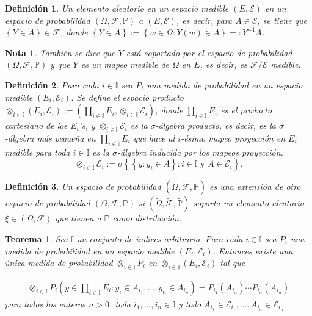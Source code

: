 \documentclass{article}
\newtheorem{Def}{Definición}
\newtheorem{Teo}{Teorema}
\newtheorem{Note}{Nota}
\newcommand{\prob}{\mathbb{P}}
\begin{document}
\begin{Def}
Un elemento aleatorio en un espacio medible $\left(E,\mathcal{E}\right)$ en un espacio de probabilidad $\left(\Omega,\mathcal{F},\prob\right)$ a $\left(E,\mathcal{E}\right)$, es decir,
para $A\in \mathcal{E}$,  se tiene que $\left\{Y\in A\right\}\in\mathcal{F}$, donde $\left\{Y\in A\right\}:=\left\{w\in\Omega:Y\left(w\right)\in A\right\}=:Y^{-1}A$.
\end{Def}

\begin{Note}
Tambi\'en se dice que $Y$ est\'a soportado por el espacio de probabilidad $\left(\Omega,\mathcal{F},\prob\right)$ y que $Y$ es un mapeo medible de $\Omega$ en $E$, es decir, es $\mathcal{F}/\mathcal{E}$ medible.
\end{Note}

\begin{Def}
Para cada $i\in \mathbb{I}$ sea $P_{i}$ una medida de probabilidad en un espacio medible $\left(E_{i},\mathcal{E}_{i}\right)$. Se define el espacio producto
$\otimes_{i\in\mathbb{I}}\left(E_{i},\mathcal{E}_{i}\right):=\left(\prod_{i\in\mathbb{I}}E_{i},\otimes_{i\in\mathbb{I}}\mathcal{E}_{i}\right)$, donde $\prod_{i\in\mathbb{I}}E_{i}$ es el producto cartesiano de los $E_{i}$'s, y $\otimes_{i\in\mathbb{I}}\mathcal{E}_{i}$ es la $\sigma$-\'algebra producto, es decir, es la $\sigma$-\'algebra m\'as peque\~na en $\prod_{i\in\mathbb{I}}E_{i}$ que hace al $i$-\'esimo mapeo proyecci\'on en $E_{i}$ medible para toda $i\in\mathbb{I}$ es la $\sigma$-\'algebra inducida por los mapeos proyecci\'on. $$\otimes_{i\in\mathbb{I}}\mathcal{E}_{i}:=\sigma\left\{\left\{y:y_{i}\in A\right\}:i\in\mathbb{I}\textrm{ y }A\in\mathcal{E}_{i}\right\}.$$
\end{Def}

\begin{Def}
Un espacio de probabilidad $\left(\tilde{\Omega},\tilde{\mathcal{F}},\tilde{\prob}\right)$ es una extensi\'on de otro espacio de probabilidad $\left(\Omega,\mathcal{F},\prob\right)$ si $\left(\tilde{\Omega},\tilde{\mathcal{F}},\tilde{\prob}\right)$ soporta un elemento aleatorio $\xi\in\left(\Omega,\mathcal{F}\right)$ que tienen a $\prob$ como distribuci\'on.
\end{Def}

\begin{Teo}
Sea $\mathbb{I}$ un conjunto de \'indices arbitrario. Para cada $i\in\mathbb{I}$ sea $P_{i}$ una medida de probabilidad en un espacio medible $\left(E_{i},\mathcal{E}_{i}\right)$. Entonces existe una \'unica medida de probabilidad $\otimes_{i\in\mathbb{I}}P_{i}$ en $\otimes_{i\in\mathbb{I}}\left(E_{i},\mathcal{E}_{i}\right)$ tal que 

\begin{eqnarray*}
\otimes_{i\in\mathbb{I}}P_{i}\left(y\in\prod_{i\in\mathbb{I}}E_{i}:y_{i}\in A_{i_{1}},\ldots,y_{n}\in A_{i_{n}}\right)=P_{i_{1}}\left(A_{i_{n}}\right)\cdots P_{i_{n}}\left(A_{i_{n}}\right)
\end{eqnarray*}
para todos los enteros $n>0$, toda $i_{1},\ldots,i_{n}\in\mathbb{I}$ y todo $A_{i_{1}}\in\mathcal{E}_{i_{1}},\ldots,A_{i_{n}}\in\mathcal{E}_{i_{n}}$
\end{Teo}
\end{document}
